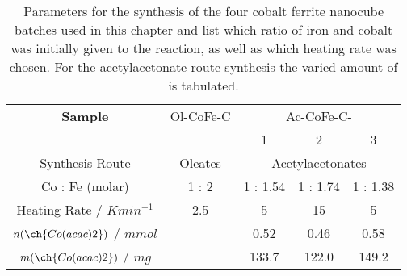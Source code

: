 \documentclass[\main/dresen_thesis.tex]{subfiles}
\begin{document}
    \begin{table}[htbp]
      \centering
      \caption{\label{tab:monolayers:synthesis:nanoparticles}Parameters for the synthesis of the four cobalt ferrite nanocube batches used in this chapter and list which ratio of iron and cobalt was initially given to the reaction, as well as which heating rate was chosen. For the acetylacetonate route synthesis the varied amount of  is tabulated.}
      \begin{tabular}{ c || c || c | c | c }
        \textbf{Sample} & Ol-CoFe-C & \multicolumn{3}{c}{Ac-CoFe-C-}\\
                        &           & 1 & 2 & 3 \\
        \hline
        \rule{0pt}{2ex} Synthesis Route                       & Oleates & \multicolumn{3}{c}{Acetylacetonates}\\
        \hline
        \rule{0pt}{2ex} Co : Fe (molar)                       & 1 : 2   & 1 : 1.54 & 1 : 1.74 & 1 : 1.38 \\
        \hline
        \rule{0pt}{2ex} Heating Rate / $\unit{K min^{-1}}$    & 2.5     & 5        & 15       & 5 \\
        \hline
        \rule{0pt}{2ex} $n(\ch{Co(acac)2})$ / $\unit{mmol}$   &         & 0.52     & 0.46      & 0.58  \\
        \rule{0pt}{2ex} $m(\ch{Co(acac)2})$ / $\unit{mg}$     &         & 133.7    & 122.0     & 149.2 \\
        \hline
      \end{tabular}
    \end{table}
\end{document}
